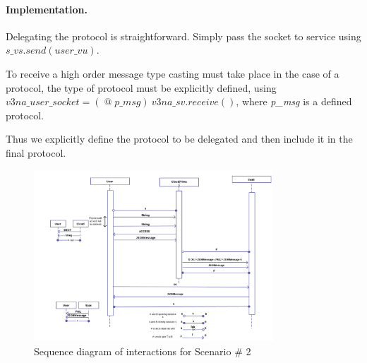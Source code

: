 \documentclass[10pt]{llncs}
\begin{document}
\paragraph{Implementation.} %
Delegating the protocol is straightforward. Simply pass the socket to service using $\textit{s\_vs}.\textit{send}(\textit{user\_vu})$.

To receive a high order message type casting must take place in the case of a protocol, the type of protocol must be explicitly defined, using $\textit{v3na\_user\_socket} = \left(\mathopen{@}\textit{p\_msg}\right)~\textit{v3na\_sv}.\textit{receive}()$, where \textit{p\_msg} is a defined protocol.

Thus we explicitly define the protocol to be delegated and then include it in the final protocol.

\begin{figure}
\centering
\includegraphics[width=0.8\textwidth]{resources/interaction-sc2.png}
\caption{Sequence diagram of interactions for Scenario \# 2}
\label{fig:seq-diagram-sc2}
\end{figure}
\end{document}
